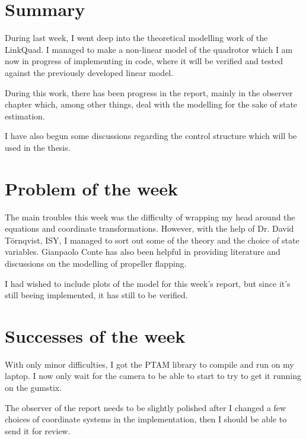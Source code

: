 \section{Summary}
During last week, I went deep into the theoretical modelling work of the
LinkQuad. I managed to make a non-linear model of the quadrotor which
I am now in progress of implementing in code, where it will be verified
and tested against the previously developed linear model.

During this work, there has been progress in the report, mainly in the
observer chapter which, among other things, deal with the modelling for the
sake of state estimation.

I have also begun some discussions regarding the control structure
which will be used in the thesis.

\section{Problem of the week}
The main troubles this week was the difficulty of
wrapping my head around the equations and coordinate transformations.
However, with the help of Dr. David Törnqvist, ISY, I managed to sort out
some of the theory and the choice of state variables.
Gianpaolo Conte has also been helpful in providing literature and discussions
on the modelling of propeller flapping.

I had wished to include plots of the model for this week's report, but
since it's still beeing implemented, it has still to be verified.

\section{Successes of the week}
With only minor difficulties, I got the PTAM library to compile and run on my laptop.
I now only wait for the camera to be able to start to try to get it running
on the gumstix.

The observer of the report needs to be slightly polished after I changed
a few choices of coordinate systems in the implementation, then I should
be able to send it for review.
